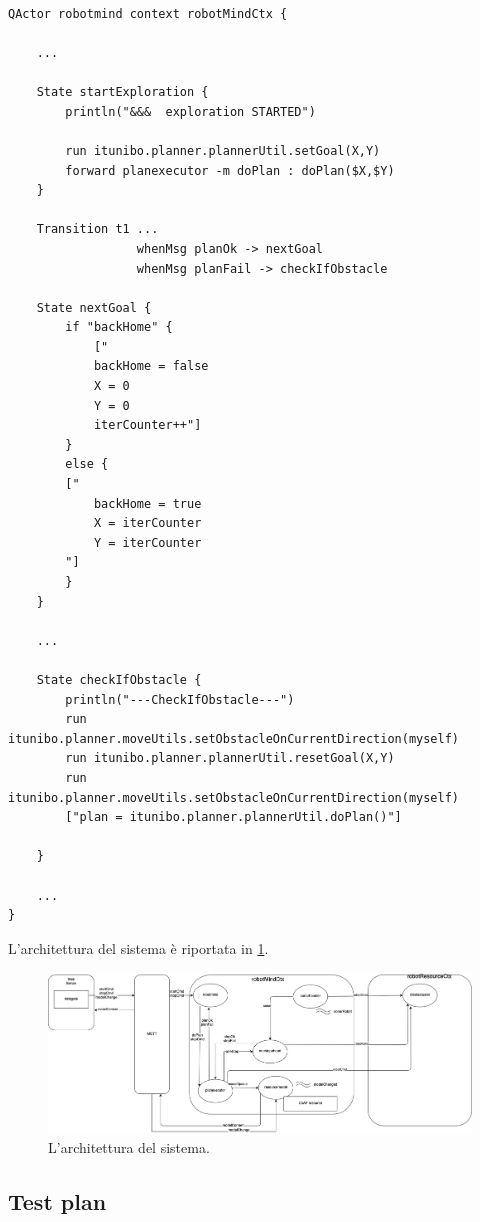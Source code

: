 \begin{lstlisting}[backgroundcolor=\color{white}, label={lst:robotmind-ddr-sys-5}, caption={"Codice di robotmind in ddrSystem5"}]



QActor robotmind context robotMindCtx { 

    ...

	State startExploration {
		println("&&&  exploration STARTED")
	
		run itunibo.planner.plannerUtil.setGoal(X,Y)
		forward planexecutor -m doPlan : doPlan($X,$Y)
	}
	
	Transition t1 ...
	              whenMsg planOk -> nextGoal
				  whenMsg planFail -> checkIfObstacle
				  
	State nextGoal {
		if "backHome" {
			["
			backHome = false
			X = 0
			Y = 0
			iterCounter++"]
		}
		else {
		["
			backHome = true
			X = iterCounter
			Y = iterCounter
		"]
		}
	}
	
	...
	
	State checkIfObstacle {
		println("---CheckIfObstacle---")
		run itunibo.planner.moveUtils.setObstacleOnCurrentDirection(myself)
		run itunibo.planner.plannerUtil.resetGoal(X,Y)
		run itunibo.planner.moveUtils.setObstacleOnCurrentDirection(myself)
		["plan = itunibo.planner.plannerUtil.doPlan()"]	
		
	}
	
    ...
}

\end{lstlisting}

L'architettura del sistema è riportata in \cref{fig:arch_logica_4}.

\begin{figure}[H]
  \includegraphics[width=\textwidth]{img/sprint4/arch_logica_4.png}
  \caption{L'architettura del sistema.}
  \label{fig:arch_logica_4}
\end{figure}


\subsection{Test plan}

